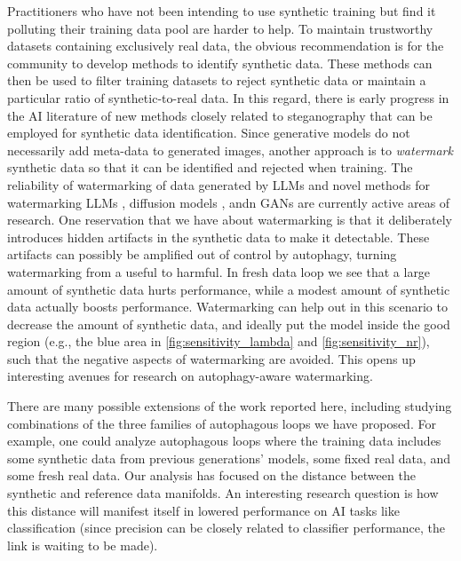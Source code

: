 \documentclass{article}
\def\colorFresh{colorC}
\def\fresh{\textcolor{\colorFresh}{fresh data loop}}
\begin{document}
Practitioners who have not been intending to use synthetic training but find it polluting their training data pool are harder to help.
%
To maintain trustworthy datasets containing exclusively real data, the obvious recommendation is for the community to develop methods to identify synthetic data. 
These methods can then be used to filter training datasets to reject synthetic data or maintain a particular ratio of synthetic-to-real data.
%
In this regard, there is early progress in the AI literature of new methods closely related to steganography \cite{guarnera2020deepfake} that can be employed for synthetic data identification.
%
Since generative models do not necessarily add meta-data to generated images, another approach is to {\em watermark} synthetic data so that it can be identified and rejected when training. 
%
The reliability of watermarking of data generated by LLMs \cite{kirchenbauer2023reliability} and novel methods for watermarking LLMs \cite{watermark}, diffusion models \cite{watermark_diffusion,peng2023protecting,wen2023tree, fernandez2023stable}, andn GANs \cite{fei2022supervised} are currently active areas of research. 
One reservation that we have about watermarking is that it deliberately introduces hidden artifacts in the synthetic data to make it detectable. 
These artifacts can possibly be amplified out of control by autophagy, turning watermarking from a useful to harmful.
%
In \fresh{} we see that a large amount of synthetic data hurts performance, while a modest amount of synthetic data actually boosts performance. 
%
Watermarking can help out in this scenario to decrease the amount of synthetic data, and ideally put the model inside the good region (e.g., the blue area in \cref{fig:sensitivity_lambda} and \cref{fig:sensitivity_nr}), such that the negative aspects of watermarking are avoided. 
%
This opens up interesting avenues for research on autophagy-aware watermarking. 


There are many possible extensions of the work reported here, including studying combinations of the three families of autophagous loops we have proposed.
For example, one could analyze autophagous loops where the training data includes some synthetic data from previous generations' models, some fixed real data, and some fresh real data.
Our analysis has focused on the distance between the synthetic and reference data manifolds.  
An interesting research question is how this distance will manifest itself in lowered performance on AI tasks like classification
(since precision can be closely related to classifier performance, the link is waiting to be made).
\end{document}
